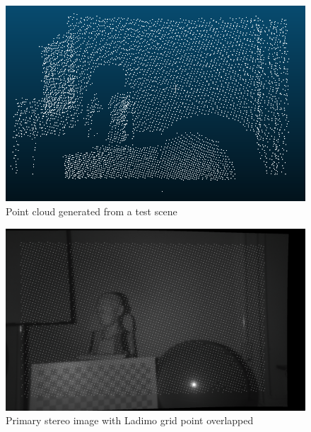 \begin{figure}[t]
	\begin{center}
		\includegraphics[width=.8\textwidth]{images/point-cloud-example.png}
		\caption{Point cloud generated from a test scene}
		\label{fig:point-cloud-input}
	\end{center}
\end{figure}

\begin{figure}[t]
	\begin{center}
		\includegraphics[width=.8\textwidth]{images/stereo-rectified-rgb.png}
		\caption{Primary stereo image with Ladimo grid point overlapped}
		\label{fig:primary-stereo-input}
	\end{center}
\end{figure}


